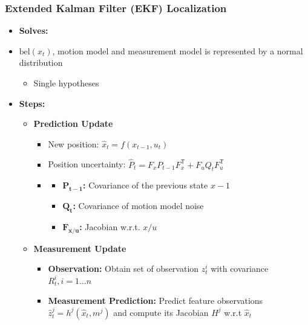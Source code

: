 \documentclass[a4paper]{article}
\newcommand{\ides}[1]{\item \textbf{#1}}
\newcommand{\transpose}{\mathsf{T}}
\begin{document}
\subsubsection{Extended Kalman Filter (EKF) Localization}
\begin{itemize}
    \ides{Solves:}
    \item $\text{bel}(x_t)$, motion model and measurement model is represented by a normal distribution
        \begin{itemize}
            \item Single hypotheses
        \end{itemize}
    \ides{Steps:}
        \begin{itemize}
            \item[S1)] \textbf{Prediction Update}
                \begin{itemize}
                    \item New position: $\hat x_t = f(x_{t-1}, u_t)$
                    \item Position uncertainty: $\hat P_t = F_x P_{t-1} F_x^\transpose + F_u Q_t F_u^\transpose$
                    \item
                        \begin{itemize}
                            \ides{$\mathbf{P_{t - 1}}$:} Covariance of the previous state $x - 1$
                            \ides{$\mathbf{Q_t}$:} Covariance of motion model noise
                            \ides{$\mathbf{F_{x/u}}$:} Jacobian w.r.t. $x/u$
                        \end{itemize}
                \end{itemize}
            \item[S2)] \textbf{Measurement Update}
                \begin{itemize}
                    \item[1)] \textbf{Observation:} Obtain set of observation $z_t^i$ with covariance $R_t^i, i=1 \dots n$
                    \item[2)] \textbf{Measurement Prediction:} Predict feature observations $\hat z_t^j = h^j(\hat x_t, m^j)$ and compute its Jacobian $H^j$ w.r.t $\hat x_t$


\end{itemize}
\end{itemize}
\end{itemize}
\end{document}

